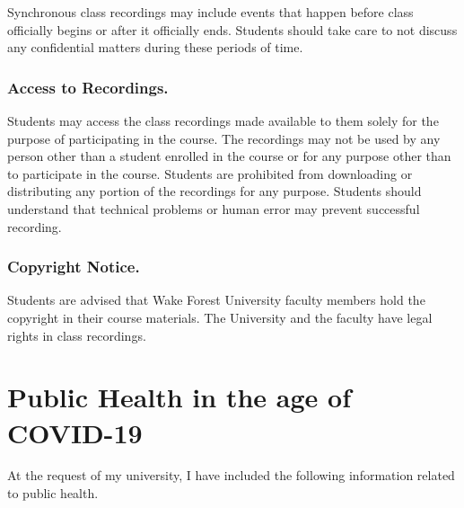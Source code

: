 \documentclass[
]{book}
\begin{document}
Synchronous class recordings may include events that happen before class officially begins or after it officially ends. Students should take care to not discuss any confidential matters during these periods of time.

\hypertarget{access-to-recordings.}{%
\subsection{Access to Recordings.}\label{access-to-recordings.}}

Students may access the class recordings made available to them solely for the purpose of participating in the course. The recordings may not be used by any person other than a student enrolled in the course or for any purpose other than to participate in the course. Students are prohibited from downloading or distributing any portion of the recordings for any purpose. Students should understand that technical problems or human error may prevent successful recording.

\hypertarget{copyright-notice.}{%
\subsection{Copyright Notice.}\label{copyright-notice.}}

Students are advised that Wake Forest University faculty members hold the copyright in their course materials. The University and the faculty have legal rights in class recordings.

\hypertarget{public-health-in-the-age-of-covid-19}{%
\chapter{Public Health in the age of COVID-19}\label{public-health-in-the-age-of-covid-19}}

At the request of my university, I have included the following information related to public health.
\end{document}
